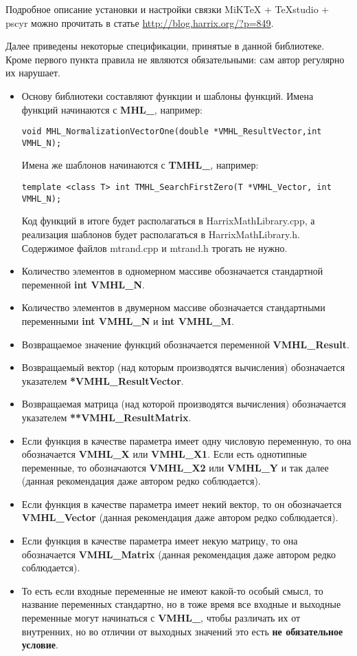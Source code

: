 \documentclass[a4paper,12pt]{article}
\begin{document}
Подробное описание установки и настройки связки MiKTeX + TeXstudio + pscyr можно прочитать в статье \href{http://blog.harrix.org/?p=849}{http://blog.harrix.org/?p=849}.

Далее приведены некоторые спецификации, принятые в данной библиотеке. Кроме первого пункта правила не являются обязательными: сам автор регулярно их нарушает.
\begin{itemize}
\item Основу библиотеки составляют функции и шаблоны функций. Имена функций начинаются с \textbf{MHL\_}, например:
\begin{lstlisting}[label=examplename,caption=Пример названия функции]
void MHL_NormalizationVectorOne(double *VMHL_ResultVector,int VMHL_N);
\end{lstlisting}
Имена же шаблонов начинаются с \textbf{TMHL\_}, например:
\begin{lstlisting}[label=examplename2,caption=Пример названия шаблона функции]
template <class T> int TMHL_SearchFirstZero(T *VMHL_Vector, int VMHL_N);
\end{lstlisting}
Код функций в итоге будет располагаться в HarrixMathLibrary.cpp, а реализация шаблонов будет располагаться в HarrixMathLibrary.h. Содержимое файлов mtrand.cpp и mtrand.h трогать не нужно.
\item Количество элементов в одномерном массиве обозначается стандартной переменной  \textbf{int VMHL\_N}.
\item Количество элементов в двумерном массиве обозначается стандартными переменными  \textbf{int VMHL\_N} и \textbf{int VMHL\_M}.
\item Возвращаемое значение функций обозначается переменной \textbf{VMHL\_Result}.
\item Возвращаемый вектор (над которым производятся вычисления) обозначается указателем \textbf{*VMHL\_ResultVector}.
\item Возвращаемая матрица (над которой производятся вычисления) обозначается указателем \textbf{**VMHL\_ResultMatrix}.
\item Если функция в качестве параметра имеет одну числовую переменную, то она обозначается \textbf{VMHL\_X} или \textbf{VMHL\_X1}. Если есть однотипные переменные, то обозначаются \textbf{VMHL\_X2} или \textbf{VMHL\_Y} и так далее (данная рекомендация даже автором редко соблюдается).
\item Если функция в качестве параметра имеет некий вектор, то он обозначается \textbf{VMHL\_Vector} (данная рекомендация даже автором редко соблюдается).
\item Если функция в качестве параметра имеет некую матрицу, то она обозначается \textbf{VMHL\_Matrix} (данная рекомендация даже автором редко соблюдается).
\item То есть если входные переменные не имеют какой-то особый смысл, то название переменных стандартно, но в тоже время все входные и выходные переменные могут начинаться с \textbf{VMHL\_}, чтобы различать их от внутренних, но во отличии от выходных значений это есть \textbf{не обязательное условие}.
\end{itemize}
\end{document}
